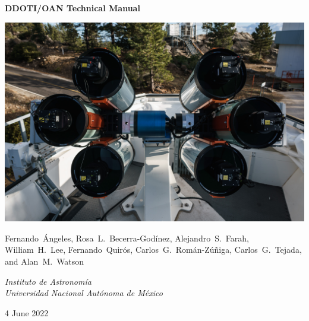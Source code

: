 \begin{centering}
{
 \Large
 \bfseries 
 DDOTI/OAN Technical Manual
 \par
}
\bigskip
\bigskip
\includegraphics[width=\linewidth]{figures/frontmatter-ddoti.jpg}

\bigskip
\bigskip
{
\baselineskip=10pt
 \large
 Fernando~Ángeles,
 Rosa~L.~Becerra-Godínez,
 Alejandro~S.~Farah,
 William~H.~Lee,
 Fernando~Quirós,
 Carlos~G.~Román-Zúñiga,
 Carlos~G.~Tejada,
 and
 Alan~M.~Watson
 \par
}
\bigskip
{
 \large
 \itshape 
 Instituto de Astronomía\\
 Universidad Nacional Autónoma de México
 \par
}
\bigskip
{
 \large
 4 June 2022
}
\fi

\end{centering}

\newpage

\pagestyle{plain}


\tableofcontents

